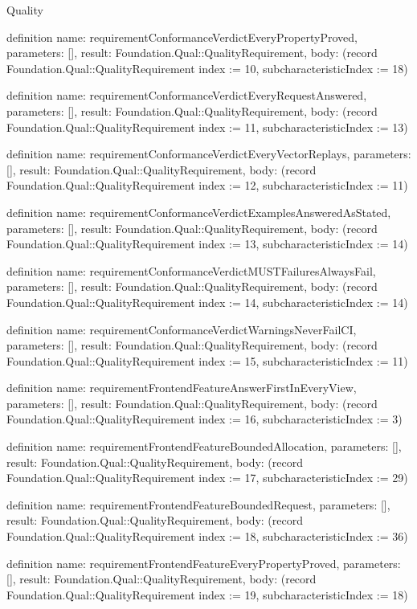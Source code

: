 \begin{lexlean}{Quality}
\begin{semanticmodule}
definition{
  name: requirementConformanceVerdictEveryPropertyProved,
  parameters: [],
  result: Foundation.Qual::QualityRequirement,
  body: (record Foundation.Qual::QualityRequirement {index := 10, subcharacteristicIndex := 18})
}

definition{
  name: requirementConformanceVerdictEveryRequestAnswered,
  parameters: [],
  result: Foundation.Qual::QualityRequirement,
  body: (record Foundation.Qual::QualityRequirement {index := 11, subcharacteristicIndex := 13})
}

definition{
  name: requirementConformanceVerdictEveryVectorReplays,
  parameters: [],
  result: Foundation.Qual::QualityRequirement,
  body: (record Foundation.Qual::QualityRequirement {index := 12, subcharacteristicIndex := 11})
}

definition{
  name: requirementConformanceVerdictExamplesAnsweredAsStated,
  parameters: [],
  result: Foundation.Qual::QualityRequirement,
  body: (record Foundation.Qual::QualityRequirement {index := 13, subcharacteristicIndex := 14})
}

definition{
  name: requirementConformanceVerdictMUSTFailuresAlwaysFail,
  parameters: [],
  result: Foundation.Qual::QualityRequirement,
  body: (record Foundation.Qual::QualityRequirement {index := 14, subcharacteristicIndex := 14})
}

definition{
  name: requirementConformanceVerdictWarningsNeverFailCI,
  parameters: [],
  result: Foundation.Qual::QualityRequirement,
  body: (record Foundation.Qual::QualityRequirement {index := 15, subcharacteristicIndex := 11})
}

definition{
  name: requirementFrontendFeatureAnswerFirstInEveryView,
  parameters: [],
  result: Foundation.Qual::QualityRequirement,
  body: (record Foundation.Qual::QualityRequirement {index := 16, subcharacteristicIndex := 3})
}

definition{
  name: requirementFrontendFeatureBoundedAllocation,
  parameters: [],
  result: Foundation.Qual::QualityRequirement,
  body: (record Foundation.Qual::QualityRequirement {index := 17, subcharacteristicIndex := 29})
}

definition{
  name: requirementFrontendFeatureBoundedRequest,
  parameters: [],
  result: Foundation.Qual::QualityRequirement,
  body: (record Foundation.Qual::QualityRequirement {index := 18, subcharacteristicIndex := 36})
}

definition{
  name: requirementFrontendFeatureEveryPropertyProved,
  parameters: [],
  result: Foundation.Qual::QualityRequirement,
  body: (record Foundation.Qual::QualityRequirement {index := 19, subcharacteristicIndex := 18})
}


\end{semanticmodule}
\end{lexlean}
